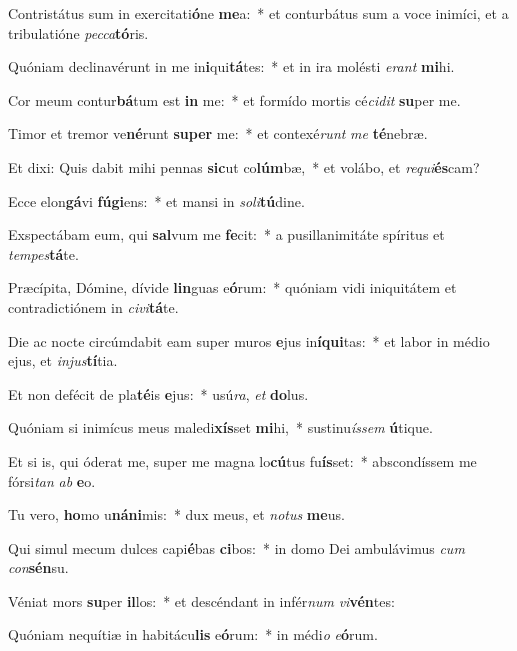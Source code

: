 \item Contristátus sum in exercitati\textbf{ó}ne \textbf{me}a:~* et conturbátus sum a voce inimíci, et a tribulatióne \textit{pec}\textit{ca}\textbf{tó}ris.
\item Quóniam declinavérunt in me in\textbf{i}qui\textbf{tá}tes:~* et in ira molésti \textit{e}\textit{rant} \textbf{mi}hi.
\item Cor meum contur\textbf{bá}tum est \textbf{in} me:~* et formído mortis cé\textit{ci}\textit{dit} \textbf{su}per me.
\item Timor et tremor ve\textbf{né}runt \textbf{su}\textbf{per} me:~* et contexé\textit{runt} \textit{me} \textbf{té}nebræ.
\item Et dixi: Quis dabit mihi pennas \textbf{sic}ut co\textbf{lúm}bæ,~* et volábo, et \textit{re}\textit{qui}\textbf{és}cam?
\item Ecce elon\textbf{gá}vi \textbf{fú}\textbf{gi}ens:~* et mansi in \textit{so}\textit{li}\textbf{tú}dine.
\item Exspectábam eum, qui \textbf{sal}vum me \textbf{fe}cit:~* a pusillanimitáte spíritus et \textit{tem}\textit{pes}\textbf{tá}te.
\item Præcípita, Dómine, dívide \textbf{lin}guas e\textbf{ó}rum:~* quóniam vidi iniquitátem et contradictiónem in \textit{ci}\textit{vi}\textbf{tá}te.
\item Die ac nocte circúmdabit eam super muros \textbf{e}jus in\textbf{í}\textbf{qui}tas:~* et labor in médio ejus, et \textit{in}\textit{jus}\textbf{tí}tia.
\item Et non defécit de pla\textbf{té}is \textbf{e}jus:~* usú\textit{ra}, \textit{et} \textbf{do}lus.
\item Quóniam si inimícus meus maledi\textbf{xís}set \textbf{mi}hi,~* sustinu\textit{ís}\textit{sem} \textbf{ú}tique.
\item Et si is, qui óderat me, super me magna lo\textbf{cú}tus fu\textbf{ís}set:~* abscondíssem me fórsi\textit{tan} \textit{ab} \textbf{e}o.
\item Tu vero, \textbf{ho}mo u\textbf{ná}\textbf{ni}mis:~* dux meus, et \textit{no}\textit{tus} \textbf{me}us.
\item Qui simul mecum dulces capi\textbf{é}bas \textbf{ci}bos:~* in domo Dei ambulávimus \textit{cum} \textit{con}\textbf{sén}su.
\item Véniat mors \textbf{su}per \textbf{il}los:~* et descéndant in infér\textit{num} \textit{vi}\textbf{vén}tes:
\item Quóniam nequítiæ in habitácu\textbf{lis} e\textbf{ó}rum:~* in médi\textit{o} \textit{e}\textbf{ó}rum.
